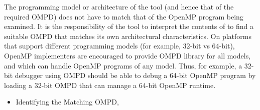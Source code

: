 The programming model or architecture of the tool (and hence
that of the required OMPD) does not have to match that of the OpenMP program
being examined.
It is the responsibility of the tool to interpret the contents
of  to find a suitable OMPD that matches
its own architectural characteristics.
On platforms that support different programming models
(for example, 32-bit vs 64-bit), OpenMP implementers are encouraged
to provide OMPD library for all models, and which can handle
OpenMP programs of any model.
Thus, for example, a 32-bit debugger using OMPD should be able
to debug a 64-bit OpenMP program
by loading a 32-bit OMPD that can manage a 64-bit OpenMP runtime.

\crossreferences
\begin{itemize}
	\item Identifying the Matching OMPD, 
\end{itemize}



